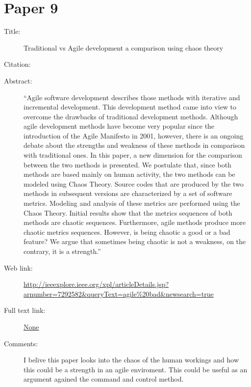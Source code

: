 \documentclass{scrartcl}
\begin{document}
\section*{Paper 9}
\begin{description}
	\item[Title:] Traditional vs Agile development a comparison using chaos theory 
	\item[Citation:] \cite{Chaos}
	\item[Abstract:] ``Agile software development describes those methods with iterative and incremental development. This development method came into view to overcome the drawbacks of traditional development methods. Although agile development methods have become very popular since the introduction of the Agile Manifesto in 2001, however, there is an ongoing debate about the strengths and weakness of these methods in comparison with traditional ones. In this paper, a new dimension for the comparison between the two methods is presented. We postulate that, since both methods are based mainly on human activity, the two methods can be modeled using Chaos Theory. Source codes that are produced by the two methods in subsequent versions are characterized by a set of software metrics. Modeling and analysis of these metrics are performed using the Chaos Theory. Initial results show that the metrics sequences of both methods are chaotic sequences. Furthermore, agile methods produce more chaotic metrics sequences. However, is being chaotic a good or a bad feature? We argue that sometimes being chaotic is not a weakness, on the contrary, it is a strength.''
	\item[Web link:] \url{http://ieeexplore.ieee.org/xpl/articleDetails.jsp?arnumber=7292582&queryText=agile%20bad&newsearch=true}
	\item[Full text link:] \url{None}
	\item[Comments:] I belive this paper looks into the chaos of the human workings and how this could be a strength in an agile enviroment. This could be useful as an argument agained the command and control method.
\end{description}
\end{document}
